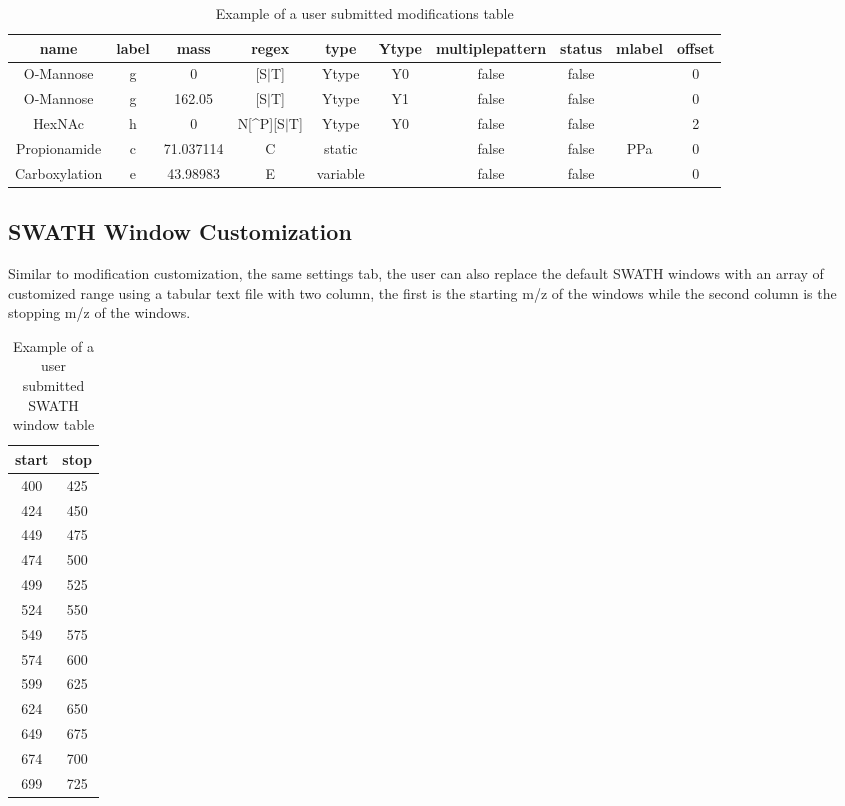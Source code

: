 \documentclass[../manual.tex]{subfiles}
\begin{document}
\begin{table}[h]
	\caption{Example of a user submitted modifications table}
	\begin{adjustbox}{width=1\textwidth}
		\small
		\begin{tabular}{c c c c c c c c c c}
			\hline name & label & mass & regex & type & Ytype & multiplepattern & status & mlabel & offset \\ [0.1ex]
			\hline\hline
			O-Mannose & g & 0 & [S$|$T] & Ytype & Y0 & false & false & & 0 \\
			O-Mannose & g & 162.05 & [S$|$T] & Ytype &  Y1 & false & false & & 0 \\
			HexNAc & h & 0 & N[\^{}P][S$|$T] & Ytype &  Y0 & false & false & & 2 \\
			Propionamide & c & 71.037114 & C & static &  & false & false & PPa & 0 \\
			Carboxylation & e & 43.98983 & E & variable &  & false & false &  & 0 \\
		\end{tabular}
	\end{adjustbox}
\end{table}

\subsection{SWATH Window Customization}
Similar to modification customization, the same settings tab, the user can also replace the default SWATH windows with an array of customized range using a tabular text file with two column, the first is the starting m/z of the windows while the second column is the stopping m/z of the windows.
\begin{table}[h]
	\caption{Example of a user submitted SWATH window table}
	\centering
	\begin{tabular}{c c}
		\hline start & stop \\
		\hline\hline
		400 & 425 \\
		424 & 450 \\
		449	& 475 \\
		474 & 500 \\
		499 & 525 \\
		524 & 550 \\
		549 & 575 \\
		574 & 600 \\
		599 & 625 \\
		624 & 650 \\
		649 & 675 \\
		674 & 700 \\
		699 & 725 \\
	\end{tabular}
\end{table} 
\end{document}
